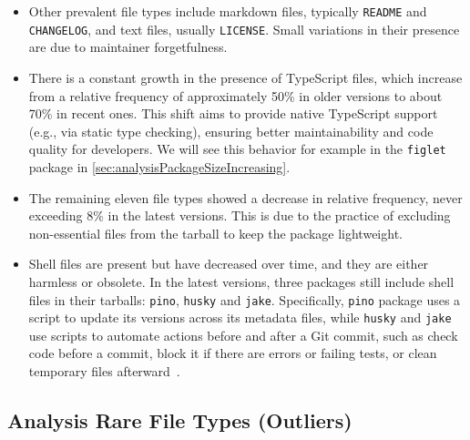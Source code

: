 \begin{itemize}
\begin{itemize}
        Other packages, like \texttt{node-releases}, which offers a list of Node.js release versions~\cite{node-releases},
        or \texttt{spdx-license-ids}, which provides the official list of \ac{SPDX} licenses~\cite{spdx-license-ids};
        contain this information in JSON files without including JavaScript or TypeScript files.
        
        Developers use these packages as dependencies to retrieve current data without manual hard-coding.

    \end{itemize}

    \item Other prevalent file types include markdown files, typically \texttt{README} and \texttt{CHANGELOG},
    and text files, usually \texttt{LICENSE}. Small variations in their presence are due to maintainer forgetfulness.
    
    \item There is a constant growth in the presence of TypeScript files, 
    which increase from a relative frequency of approximately 50\% in older versions to about 70\% in recent ones.
    This shift aims to provide native TypeScript support (e.g., via static type checking),
    ensuring better maintainability and code quality for developers.
    We will see this behavior for example in the \texttt{figlet} package in \cref{sec:analysisPackageSizeIncreasing}.

    \item The remaining eleven file types showed a decrease in relative frequency, never exceeding 8\% in the latest versions.
    This is due to the practice of excluding non-essential files from the tarball to keep the package lightweight.

    \item Shell files are present but have decreased over time, and they are either harmless or obsolete.
    In the latest versions, three packages still include shell files in their tarballs: \texttt{pino}, \texttt{husky} and \texttt{jake}.
    Specifically, \texttt{pino} package uses a script to update its versions across its metadata files,
    while \texttt{husky} and \texttt{jake} use scripts to automate actions before and after a Git commit,
    such as check code before a commit, block it if there are errors or failing tests, or clean temporary files afterward~\cite{husky, jake}.

\end{itemize}


\subsection*{Analysis Rare File Types (Outliers)}
\label{sec:analysisRareFileTypesOutliers}


